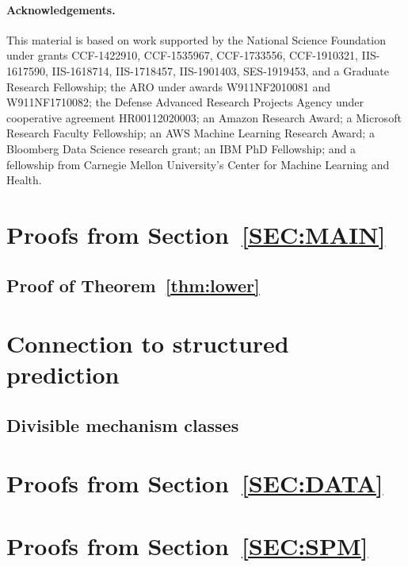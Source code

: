 \documentclass[11pt]{article}
\begin{document}
\paragraph{Acknowledgements.} This material is based on work supported by the National Science Foundation under grants CCF-1422910, CCF-1535967, CCF-1733556, CCF-1910321, IIS-1617590, IIS-1618714, IIS-1718457, IIS-1901403, SES-1919453, and a Graduate Research Fellowship; the ARO under awards W911NF2010081 and W911NF1710082; the Defense Advanced Research Projects Agency under cooperative agreement HR00112020003; an Amazon Research Award; a Microsoft Research Faculty Fellowship; an AWS Machine Learning Research Award; a Bloomberg Data Science research grant; an IBM PhD Fellowship; and a  fellowship  from  Carnegie  Mellon  University’s  Center  for Machine Learning and Health.




\appendix
\section{Proofs from Section~\ref{SEC:MAIN}}\label{APP:MAIN}



\subsection{Proof of Theorem~\ref{thm:lower}}\label{app:lower}


\section{Connection to structured prediction}\label{APP:STRUCTURED}

\subsection{Divisible mechanism classes}\label{sec:divisible}


\section{Proofs from Section~\ref{SEC:DATA}}\label{APP:DATA}


\section{Proofs from Section~\ref{SEC:SPM}}\label{APP:SPM}

\end{document}
